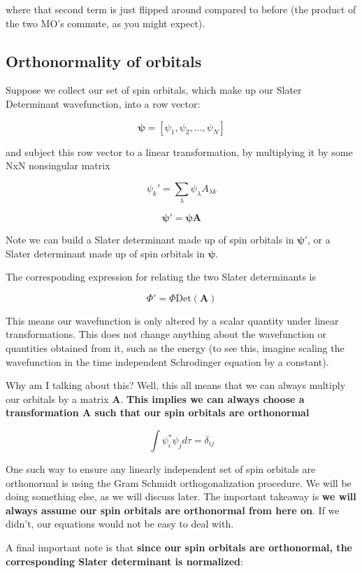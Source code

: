 \documentclass[11pt]{article}
\begin{document}
where that second term is just flipped around compared to before (the
product of the two MO's commute, as you might expect).

\subsection{Orthonormality of
orbitals}\label{orthonormality-of-orbitals}

Suppose we collect our set of spin orbitals, which make up our Slater
Determinant wavefunction, into a row vector:

\[\boldsymbol{\psi} = [\psi_1, \psi_2, \dots, \psi_N] \]

and subject this row vector to a linear transformation, by multiplying
it by some NxN nonsingular matrix

\[\psi_k' = \sum\limits_\lambda \psi_\lambda A_{\lambda k} \]

\[\boldsymbol{\psi'} = \boldsymbol{\psi} \boldsymbol{A}\]

Note we can build a Slater determinant made up of spin orbitals in
\(\boldsymbol{\psi'}\), or a Slater determinant made up of spin orbitals
in \(\boldsymbol{\psi}\).

The corresponding expression for relating the two Slater determinants is

\[\Phi' = \Phi \mathrm{Det}(\boldsymbol{A}) \]

This means our wavefunction is only altered by a scalar quantity under
linear transformations. This does not change anything about the
wavefunction or quantities obtained from it, such as the energy (to see
this, imagine scaling the wavefunction in the time independent
Schrodinger equation by a constant).

Why am I talking about this? Well, this all means that we can always
multiply our orbitals by a matrix \(\boldsymbol{A}\). \textbf{This
implies we can always choose a transformation \(\boldsymbol{A}\) such that our spin
orbitals are orthonormal}

\[\int \psi^*_i \psi_j d\tau = \delta_{ij} \]

One such way to ensure any linearly independent set of spin orbitals are
orthonormal is using the Gram Schmidt orthogonalization procedure. We
will be doing something else, as we will discuss later. The important
takeaway is \textbf{we will always assume our spin orbitals are
orthonormal from here on}. If we didn't, our equations would not be easy
to deal with.

A final important note is that \textbf{since our spin orbitals are
orthonormal, the corresponding Slater determinant is normalized}:
\end{document}
